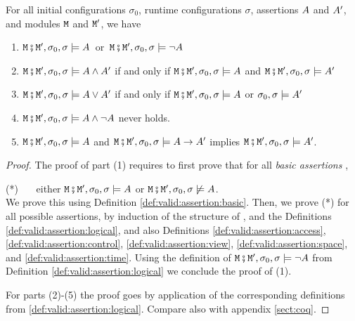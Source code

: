 \begin{lemma}
\label{lemma:classic}
For all initial configurations $\sigma_0$, runtime configurations $\sigma$,    assertions $\A$ and $\A'$, and modules $\M$  and $\M'$, we have
\begin{enumerate}
\item
$\M\mkpair \M', \sigma_0,\sigma \models \A$\ or\ $\M\mkpair \M', \sigma_0,\sigma \models \neg\A$
\item
$\M\mkpair \M', \sigma_0,\sigma  \models \A \wedge \A'$ \SP if and only if \SP $\M\mkpair \M', \sigma_0,\sigma \models \A$ and $\M\mkpair \M', \sigma_0,\sigma  \models \A'$
\item
$\M\mkpair \M', \sigma_0,\sigma  \models \A \vee \A'$ \SP if and only if \SP $\M\mkpair \M', \sigma_0,\sigma  \models \A$ or  $\sigma_0,\sigma \models \A'$
\item
$\M\mkpair \M', \sigma_0,\sigma  \models \A \wedge \neg\A$ never holds.
\item
$\M\mkpair \M', \sigma_0,\sigma  \models \A$ and  $\M\mkpair \M', \sigma_0,\sigma  \models \A \rightarrow \A'$  implies
$\M\mkpair \M', \sigma_0,\sigma  \models \A '$.
\end{enumerate}
\end{lemma}
\begin{proof}  The proof of part (1) requires to first prove that for all \emph{basic assertions} \A, \\
\strut \hspace{1.1cm} (*) \ \ \ either $\M\mkpair \M', \sigma_0,\sigma  \models \A$
or $\M\mkpair \M', \sigma_0,\sigma  \not\models \A$.\\
We prove this using Definition \ref{def:valid:assertion:basic}.
 Then, we prove (*) for all
possible assertions, by induction of the structure of \A, and the Definitions 
 \ref{def:valid:assertion:logical},
 and also Definitions
  \ref{def:valid:assertion:access}, \ref{def:valid:assertion:control}, \ref{def:valid:assertion:view},  
 \ref{def:valid:assertion:space}, and \ref{def:valid:assertion:time}.
Using the definition of $\M\mkpair \M', \sigma_0,\sigma \models \neg\A$ from Definition  \ref{def:valid:assertion:logical} we conclude the proof of (1).

For parts  (2)-(5) the proof goes by application of the corresponding definitions from \ref{def:valid:assertion:logical}.
Compare also with appendix \ref{sect:coq}.
 
  \end{proof}
 
